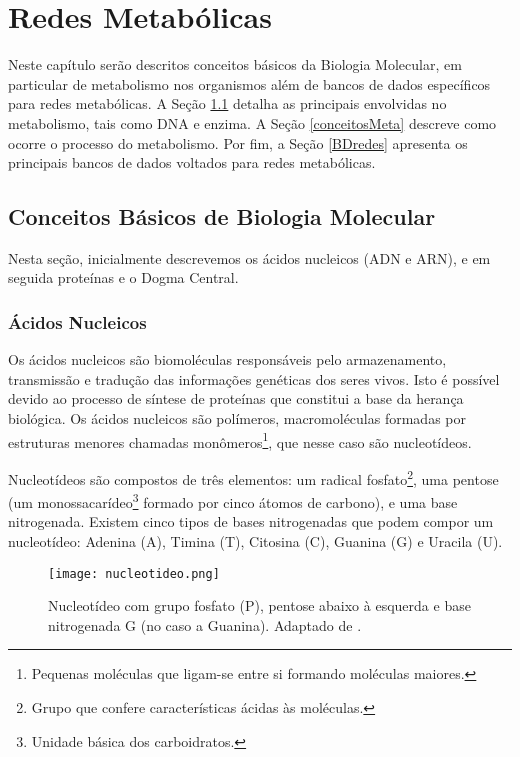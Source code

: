 \chapter{Redes Metabólicas}
 
\indent Neste capítulo serão descritos conceitos básicos da Biologia Molecular, em particular de metabolismo nos organismos além de bancos de dados específicos para redes metabólicas. A Seção \ref{conceitosBM} detalha as principais envolvidas no metabolismo, tais como DNA e enzima. A Seção \ref{conceitosMeta} descreve como ocorre o processo do metabolismo. Por fim, a Seção \ref{BDredes} apresenta os principais bancos de dados voltados para redes metabólicas.



\section{Conceitos Básicos de Biologia Molecular} \label{conceitosBM}

\indent Nesta seção, inicialmente descrevemos os ácidos nucleicos (ADN e ARN), e em seguida proteínas e o Dogma Central.

\subsection{Ácidos Nucleicos} \label{aceidosNucleicos}

\indent Os ácidos nucleicos são biomoléculas responsáveis pelo armazenamento, transmissão e tradução das informações genéticas dos seres vivos. Isto é possível devido ao processo de síntese de proteínas que constitui a base da herança biológica. Os ácidos nucleicos são polímeros, macromoléculas formadas por estruturas menores chamadas monômeros\footnote{Pequenas moléculas que ligam-se entre si formando moléculas maiores.}, que nesse caso são nucleotídeos.

\indent Nucleotídeos são compostos de três elementos: um radical fosfato\footnote{Grupo que confere características ácidas às moléculas.}, uma pentose (um monossacarídeo\footnote{Unidade básica dos carboidratos.} formado por cinco átomos de carbono), e uma base nitrogenada. Existem cinco tipos de bases nitrogenadas que podem compor um nucleotídeo: Adenina (A), Timina (T), Citosina (C), Guanina (G) e Uracila (U).

\begin{figure}[h]
    \centering
    \texttt{[image: nucleotideo.png]}
    \caption{Nucleotídeo com grupo fosfato (P), pentose abaixo à esquerda e base nitrogenada G (no caso a Guanina). Adaptado de \cite{dnadiscovery08}. }
    \label{fig:Nucleotideo}
\end{figure} 

